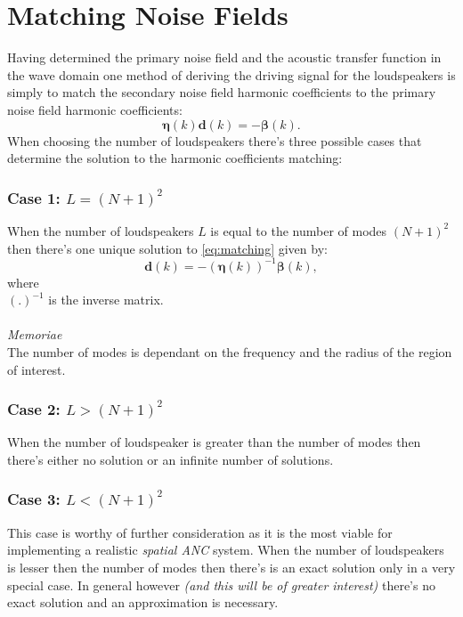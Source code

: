 \section{Matching Noise Fields}\label{sec:matching}
Having determined the primary noise field and the acoustic transfer function in the wave domain one method of deriving the driving signal for the loudspeakers is simply to match the secondary noise field harmonic coefficients to the primary noise field harmonic coefficients\cite{Zhang2019}:
\begin{equation}
    \boldsymbol{\eta}(k)\mathbf{d}(k)=-\boldsymbol{\beta}(k).
    \label{eq:matching}
\end{equation}
When choosing the number of loudspeakers there's three possible cases that determine the solution to the harmonic coefficients matching:

\subsubsection{Case 1: $L = (N + 1)^2$}
When the number of loudspeakers $L$ is equal to the number of modes $(N+1)^2$ then there's one unique solution to \ref{eq:matching} given by\cite{Zhang2019}:
\begin{equation}
    \mathbf{d}(k) = -(\boldsymbol{\eta}(k))^{-1}\boldsymbol{\beta}(k),
\end{equation}
where\\
$(.)^{-1}$ is the inverse matrix.\\\\
\textit{Memoriae}\\
The number of modes is dependant on the frequency and the radius of the region of interest.
\subsubsection{Case 2: $L > (N + 1)^2$}
When the number of loudspeaker is greater than the number of modes then there's either no solution or an infinite number of solutions\cite{Zhang2019}.
\subsubsection{Case 3: $L < (N + 1)^2$}
This case is worthy of further consideration as it is the most viable for implementing a realistic \textit{spatial ANC} system. When the number of loudspeakers is lesser then the number of modes then there's is an exact solution only in a very special case\cite{Zhang2019}. In general however \textit{(and this will be of greater interest)} there's no exact solution and an approximation is necessary.

